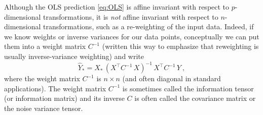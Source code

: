 \documentclass[12pt,letterpaper]{article}
\begin{document}
Although the OLS prediction \eqref{eq:OLS} is affine invariant with respect to $p$-dimensional transformations, it is \emph{not} affine invariant with respect to $n$-dimensional transformations, such as a re-weighting of the input data. Indeed, if we know weights or inverse variances for our data points, conceptually we can put them into a weight matrix $C^{-1}$ (written this way to emphasize that reweighting is usually inverse-variance weighting) and write
\begin{equation}\label{eq:wls}
    \hat{Y}_\ast = X_\ast\,(X^\top C^{-1}\,X)^{-1}\,X^\top C^{-1}\,Y
    ~,
\end{equation}
where the weight matrix $C^{-1}$ is $n\times n$ (and often diagonal in standard applications). The weight matrix $C^{-1}$ is sometimes called the information tensor (or information matrix) and its inverse $C$ is often called the covariance matrix or the noise variance tensor.
\end{document}
